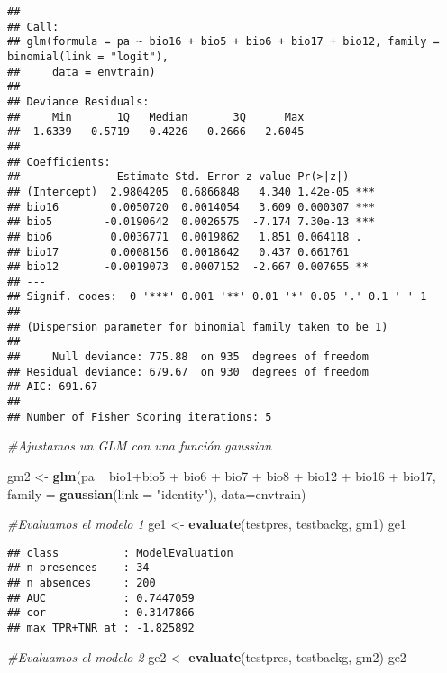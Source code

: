 \documentclass[]{article}
\newenvironment{Shaded}{\begin{snugshade}}{\end{snugshade}}
\newcommand{\KeywordTok}[1]{\textcolor[rgb]{0.13,0.29,0.53}{\textbf{{#1}}}}
\newcommand{\DataTypeTok}[1]{\textcolor[rgb]{0.13,0.29,0.53}{{#1}}}
\newcommand{\StringTok}[1]{\textcolor[rgb]{0.31,0.60,0.02}{{#1}}}
\newcommand{\CommentTok}[1]{\textcolor[rgb]{0.56,0.35,0.01}{\textit{{#1}}}}
\newcommand{\NormalTok}[1]{{#1}}
\begin{document}
\begin{verbatim}
## 
## Call:
## glm(formula = pa ~ bio16 + bio5 + bio6 + bio17 + bio12, family = binomial(link = "logit"), 
##     data = envtrain)
## 
## Deviance Residuals: 
##     Min       1Q   Median       3Q      Max  
## -1.6339  -0.5719  -0.4226  -0.2666   2.6045  
## 
## Coefficients:
##               Estimate Std. Error z value Pr(>|z|)    
## (Intercept)  2.9804205  0.6866848   4.340 1.42e-05 ***
## bio16        0.0050720  0.0014054   3.609 0.000307 ***
## bio5        -0.0190642  0.0026575  -7.174 7.30e-13 ***
## bio6         0.0036771  0.0019862   1.851 0.064118 .  
## bio17        0.0008156  0.0018642   0.437 0.661761    
## bio12       -0.0019073  0.0007152  -2.667 0.007655 ** 
## ---
## Signif. codes:  0 '***' 0.001 '**' 0.01 '*' 0.05 '.' 0.1 ' ' 1
## 
## (Dispersion parameter for binomial family taken to be 1)
## 
##     Null deviance: 775.88  on 935  degrees of freedom
## Residual deviance: 679.67  on 930  degrees of freedom
## AIC: 691.67
## 
## Number of Fisher Scoring iterations: 5
\end{verbatim}

\begin{Shaded}
\begin{Highlighting}[]
\CommentTok{#Ajustamos un GLM con una función gaussian}

\NormalTok{gm2 <-}\StringTok{ }\KeywordTok{glm}\NormalTok{(pa ~}\StringTok{  }\NormalTok{bio1+bio5 +}\StringTok{ }\NormalTok{bio6 +}\StringTok{ }\NormalTok{bio7 +}\StringTok{ }\NormalTok{bio8 +}\StringTok{ }\NormalTok{bio12 +}\StringTok{ }\NormalTok{bio16 +}\StringTok{ }\NormalTok{bio17,}
            \DataTypeTok{family =} \KeywordTok{gaussian}\NormalTok{(}\DataTypeTok{link =} \StringTok{"identity"}\NormalTok{), }\DataTypeTok{data=}\NormalTok{envtrain)}

\CommentTok{#Evaluamos el modelo 1}
\NormalTok{ge1 <-}\StringTok{ }\KeywordTok{evaluate}\NormalTok{(testpres, testbackg, gm1)}
\NormalTok{ge1}
\end{Highlighting}
\end{Shaded}

\begin{verbatim}
## class          : ModelEvaluation 
## n presences    : 34 
## n absences     : 200 
## AUC            : 0.7447059 
## cor            : 0.3147866 
## max TPR+TNR at : -1.825892
\end{verbatim}

\begin{Shaded}
\begin{Highlighting}[]
\CommentTok{#Evaluamos el modelo 2}
\NormalTok{ge2 <-}\StringTok{ }\KeywordTok{evaluate}\NormalTok{(testpres, testbackg, gm2)}
\NormalTok{ge2}
\end{Highlighting}
\end{Shaded}
\end{document}
